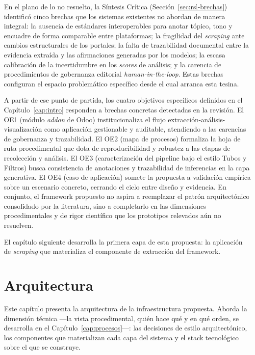\documentclass[12pt]{report}
\begin{document}
En el plano de lo no resuelto, la Síntesis Crítica (Sección~\ref{sec:rsl-brechas}) identificó cinco brechas que los sistemas existentes no abordan de manera integral: la ausencia de estándares interoperables para anotar tópico, tono y encuadre de forma comparable entre plataformas; la fragilidad del \textit{scraping} ante cambios estructurales de los portales; la falta de trazabilidad documental entre la evidencia extraída y las afirmaciones generadas por los modelos; la escasa calibración de la incertidumbre en los \textit{scores} de análisis; y la carencia de procedimientos de gobernanza editorial \textit{human-in-the-loop}. Estas brechas configuran el espacio problemático específico desde el cual arranca esta tesina.

A partir de ese punto de partida, los cuatro objetivos específicos definidos en el Capítulo~\ref{cap:intro} responden a brechas concretas detectadas en la revisión. El OE1 (módulo \textit{addon} de Odoo) institucionaliza el flujo extracción-análisis-visualización como aplicación gestionable y auditable, atendiendo a las carencias de gobernanza y trazabilidad. El OE2 (mapa de procesos) formaliza la hoja de ruta procedimental que dota de reproducibilidad y robustez a las etapas de recolección y análisis. El OE3 (caracterización del pipeline bajo el estilo Tubos y Filtros) busca consistencia de anotaciones y trazabilidad de inferencias en la capa generativa. El OE4 (caso de aplicación) somete la propuesta a validación empírica sobre un escenario concreto, cerrando el ciclo entre diseño y evidencia. En conjunto, el framework propuesto no aspira a reemplazar el patrón arquitectónico consolidado por la literatura, sino a completarlo en las dimensiones procedimentales y de rigor científico que los prototipos relevados aún no resuelven.

El capítulo siguiente desarrolla la primera capa de esta propuesta: la aplicación de \textit{scraping} que materializa el componente de extracción del framework.


\chapter{Arquitectura}
\label{cap:arquitectura}

Este capítulo presenta la arquitectura de la infraestructura propuesta. Aborda la dimensión técnica ---la vista procedimental, quién hace qué y en qué orden, se desarrolla en el Capítulo~\ref{cap:procesos}---: las decisiones de estilo arquitectónico, los componentes que materializan cada capa del sistema y el stack tecnológico sobre el que se construye.
\end{document}
